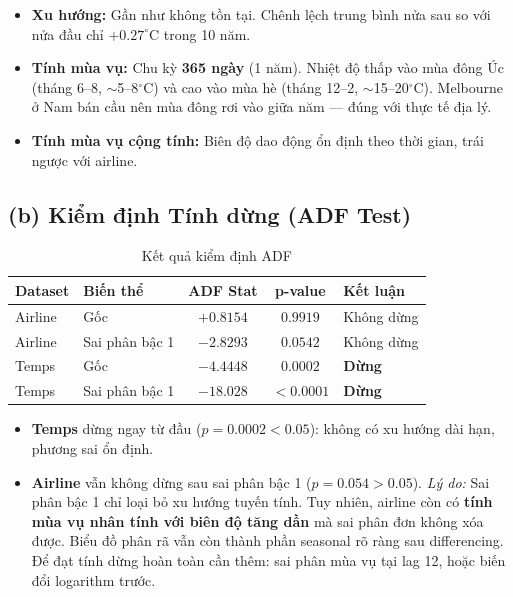 \documentclass[12pt,a4paper]{article}
\begin{document}
\begin{itemize}
    \item \textbf{Xu hướng:} Gần như không tồn tại. Chênh lệch trung bình nửa sau so với nửa đầu chỉ $+0.27^\circ$C trong 10 năm.
    \item \textbf{Tính mùa vụ:} Chu kỳ \textbf{365 ngày} (1 năm). Nhiệt độ thấp vào mùa đông Úc (tháng 6--8, $\sim$5--8$^\circ$C) và cao vào mùa hè (tháng 12--2, $\sim$15--20$^\circ$C). Melbourne ở Nam bán cầu nên mùa đông rơi vào giữa năm --- đúng với thực tế địa lý.
    \item \textbf{Tính mùa vụ cộng tính:} Biên độ dao động ổn định theo thời gian, trái ngược với airline.
\end{itemize}

\subsection{(b) Kiểm định Tính dừng (ADF Test)}

\begin{table}[H]
\centering
\caption{Kết quả kiểm định ADF}
\begin{tabular}{llccp{4.5cm}}
\toprule
\textbf{Dataset} & \textbf{Biến thể} & \textbf{ADF Stat} & \textbf{p-value} & \textbf{Kết luận} \\
\midrule
Airline & Gốc            & $+0.8154$ & $0.9919$ & Không dừng \\
Airline & Sai phân bậc 1 & $-2.8293$ & $0.0542$ & Không dừng \\
\midrule
Temps   & Gốc            & $-4.4448$ & $0.0002$ & \textbf{Dừng} \\
Temps   & Sai phân bậc 1 & $-18.028$ & $<0.0001$& \textbf{Dừng} \\
\bottomrule
\end{tabular}
\end{table}

\begin{itemize}
    \item \textbf{Temps} dừng ngay từ đầu ($p = 0.0002 < 0.05$): không có xu hướng dài hạn, phương sai ổn định.
    \item \textbf{Airline} vẫn không dừng sau sai phân bậc 1 ($p = 0.054 > 0.05$). \textit{Lý do:} Sai phân bậc 1 chỉ loại bỏ xu hướng tuyến tính. Tuy nhiên, airline còn có \textbf{tính mùa vụ nhân tính với biên độ tăng dần} mà sai phân đơn không xóa được. Biểu đồ phân rã vẫn còn thành phần seasonal rõ ràng sau differencing. Để đạt tính dừng hoàn toàn cần thêm: sai phân mùa vụ tại lag 12, hoặc biến đổi logarithm trước.
\end{itemize}
\end{document}
